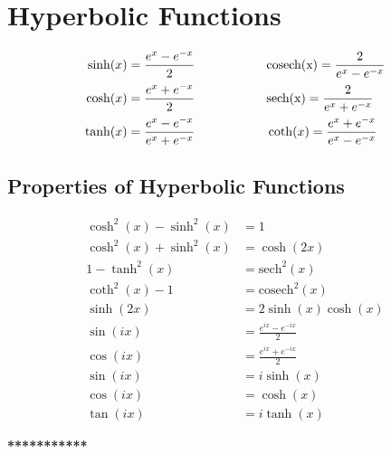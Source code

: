 \section{Hyperbolic Functions}
\begin{align*}
\sinh(x) &= \frac{e^x - e^{-x}}{2} \hspace{20mm} \mathrm{cosech(x)} = \frac{2}{e^x - e^{-x}}\\
\cosh(x) &= \frac{e^x + e^{-x}}{2} \hspace{20mm} \mathrm{sech(x)} = \frac{2}{e^x + e^{-x}}\\
\tanh(x) &= \frac{e^x - e^{-x}}{e^x + e^{-x}} \hspace{20mm} \coth(x) = \frac{e^x + e^{-x}}{e^x - e^{-x}}
\end{align*}

\subsection{Properties of Hyperbolic Functions}
\begin{align*}
\cosh^2(x) - \sinh^2(x) &= 1\\
\cosh^2(x) + \sinh^2(x) &= \cosh(2x)\\
1 - \tanh^2(x) &= \mathrm{sech}^2(x)\\
\coth^2(x) - 1 &= \mathrm{cosech}^2(x)\\
\sinh(2x) &= 2\sinh(x)\cosh(x)\\
\sin(ix) &= \frac{e^{ix} - e^{-ix}}{2}\\
\cos(ix) &= \frac{e^{ix} + e^{-ix}}{2}\\
\sin(ix) &= i\sinh(x)\\
\cos(ix) &= \cosh(x)\\
\tan(ix) &= i\tanh(x)
\end{align*}

\vspace{5mm}
\begin{center}
\textbf{***********}
\end{center}